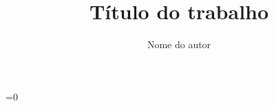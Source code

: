 \documentclass[
12pt,        %
openright,   %
twoside,     %
a4paper,     %
english,       %
brazil        %
%
%
]{ppgca}
\title{Título do trabalho}
\author{Nome do autor}
\begin{document}
=0
\newcommand{\sectionbreak}{\clearpage
\fancyhead[LE,RO]{}
\fancyhead[RE,LO]{}
\renewcommand{\headrulewidth}{0pt}
\renewcommand{\footrulewidth}{0pt}}
\fi


\imprimircapa

\imprimirfolhaderosto


%
%     
\end{document}
